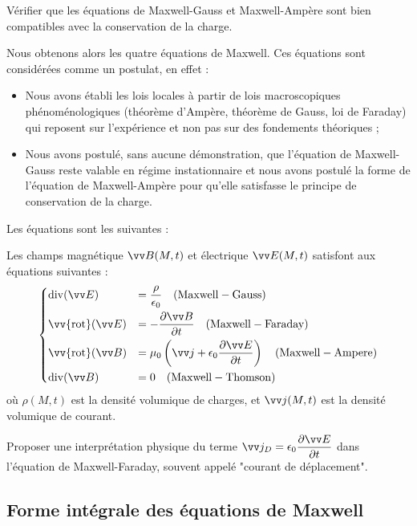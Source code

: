 \documentclass[11pt,fleqn]{book} %
\renewcommand{\div}{\mathrm{div}}
\newcommand{\rot}{\vv{\mathrm{rot}}}
\begin{document}
\begin{capex}
	Vérifier que les équations de Maxwell-Gauss et Maxwell-Ampère sont bien compatibles avec la conservation de la charge.
\end{capex}

Nous obtenons alors les quatre équations de Maxwell. Ces équations sont considérées comme un postulat, en effet :
\begin{itemize}
	\item Nous avons établi les lois locales à partir de lois macroscopiques phénoménologiques (théorème d'Ampère, théorème de Gauss, loi de Faraday) qui reposent sur l'expérience et non pas sur des fondements théoriques ;
	\item Nous avons postulé, sans aucune démonstration, que l'équation de Maxwell-Gauss reste valable en régime instationnaire et nous avons postulé la forme de l'équation de Maxwell-Ampère pour qu'elle satisfasse le principe de conservation de la charge.
\end{itemize}
Les équations sont les suivantes :

\begin{theorem}
	Les champs magnétique $\vv B(M,t)$ et électrique $\vv E(M,t)$ satisfont aux équations suivantes :
	\begin{equation}
		\begin{dcases}
			\div (\vv E) &= \dfrac{\rho}{\epsilon_0} \quad \mathrm{(Maxwell-Gauss)} \\
			\rot (\vv E) &= -\frac{\partial \vv B}{\partial t} \quad \mathrm{(Maxwell-Faraday)} \\
			\rot (\vv B) &= \mu_0 \left( \vv j + \epsilon_0 \dfrac{\partial \vv E}{\partial t} \right) \quad \mathrm{(Maxwell-Ampere)} \\
			\div (\vv B) &= 0 \quad \mathrm{(Maxwell-Thomson)}
		\end{dcases}
	\end{equation}
	où $\rho(M,t)$ est la densité volumique de charges, et $\vv j(M,t)$ est la densité volumique de courant.
\end{theorem}

\begin{capex}
	Proposer une interprétation physique du terme $\vv j_D = \epsilon_0 \dfrac{\partial \vv E}{\partial t}$ dans l'équation de Maxwell-Faraday, souvent appelé "courant de déplacement".
\end{capex}

\subsection{Forme intégrale des équations de Maxwell}
\end{document}
